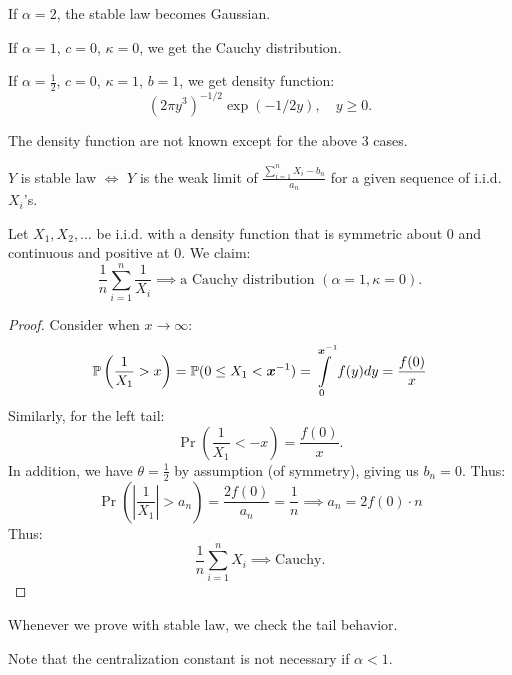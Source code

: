 \documentclass[../main/main.tex]{subfiles}
\begin{document}
\begin{example}
	If $\alpha = 2$, the stable law becomes Gaussian.
\end{example}

\begin{example}
	If $\alpha = 1$, $c=0$, $\kappa = 0$, we get the Cauchy distribution.
\end{example}

\begin{example}
	If $\alpha = \frac{1}{2}$, $c=0$, $\kappa = 1$, $b=1$, we get density function: \[
		(2 \pi y^{3})^{-1 / 2}\exp (- 1 / 2y), \quad y \geq 0.
	\]
\end{example}
\begin{remark}
	The density function are not known except for the above 3 cases.
\end{remark}
\begin{theorem}
	$Y$ is stable law $\iff$ $Y$ is the weak limit of $\frac{\sum\limits_{i=1}^{n}X_i - b_n}{a_n}$ for a given sequence of i.i.d. $X_i$'s.
\end{theorem}

\begin{example}
	Let $X_1, X_2, \ldots$ be i.i.d. with a density function that is symmetric about 0 and continuous and positive at 0. We claim: \[
		\frac{1}{n}\sum\limits_{i=1}^{n} \frac{1}{X_i} \implies \text{a Cauchy distribution }(\alpha = 1, \kappa = 0).
	\]
\end{example}

\begin{proof}
	Consider when $x \to \infty$:
	\begin{align*}
		\mathbb{P} \left( \frac{1}{X_1} > x \right)  =  \mathbb{P} (0 \leq X_1 < \bm{x}^{-1}) = \int\limits_{0}^{\bm{x}^{-1}} f(y)dy = \frac{f(0)}{x}
	\end{align*}
	Similarly, for the left tail: \[
		\Pr \left( \frac{1}{X_1} < -x \right)  = \frac{f(0)}{x}.
	\] In addition, we have $\theta = \frac{1}{2}$ by assumption (of symmetry), giving us $b_n = 0$. Thus: \[
		\Pr \left( \left| \frac{1}{X_1} \right| > a_n \right) = \frac{2f(0)}{a_n} = \frac{1}{n} \implies a_n = 2f(0) \cdot n
	\]  Thus: \[
		\frac{1}{n} \sum\limits_{i=1}^{n}X_i \implies \text{Cauchy}.
	\]
\end{proof}
\begin{remark}
	Whenever we prove with stable law, we check the tail behavior.
\end{remark}

Note that the centralization constant is not necessary if $\alpha < 1$.
\end{document}
